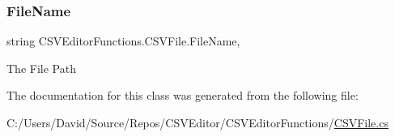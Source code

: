 \mbox{\label{class_c_s_v_editor_functions_1_1_c_s_v_file_ad692567c4f95f23945cf661da3d573c8}} 
\subsubsection{\texorpdfstring{FileName}{FileName}}
{\footnotesize\ttfamily string C\+S\+V\+Editor\+Functions.\+C\+S\+V\+File.\+File\+Name\hspace{0.3cm}{\ttfamily [get]}, {\ttfamily [set]}}



The File Path 



The documentation for this class was generated from the following file\+:\begin{DoxyCompactItemize}
\item 
C\+:/\+Users/\+David/\+Source/\+Repos/\+C\+S\+V\+Editor/\+C\+S\+V\+Editor\+Functions/\mbox{\hyperlink{_c_s_v_file_8cs}{C\+S\+V\+File.\+cs}}\end{DoxyCompactItemize}

